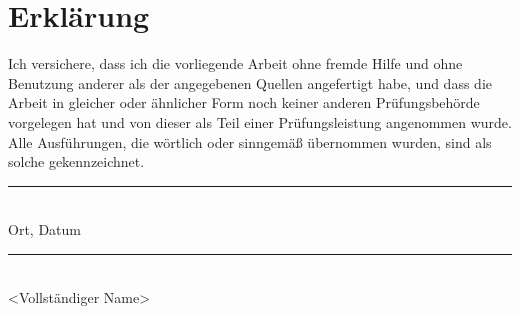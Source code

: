 \chapter*{Erklärung}
\thispagestyle{empty}

\noindent
Ich versichere, dass ich die vorliegende Arbeit ohne fremde Hilfe und ohne Benutzung anderer als der angegebenen Quellen angefertigt habe, und dass die Arbeit in gleicher oder ähnlicher Form noch keiner anderen Prüfungsbehörde vorgelegen hat und von dieser als Teil einer Prüfungsleistung angenommen wurde.
Alle Ausführungen, die wörtlich oder sinngemäß übernommen wurden, sind als solche gekennzeichnet.

\vspace{3cm}

\begin{minipage}[t]{0.45\textwidth}
    \rule{\textwidth}{0.5pt}\\
	Ort, Datum
\end{minipage}
\hfill
\begin{minipage}[t]{0.45\textwidth}
	\rule{\textwidth}{0.5pt}\\
	<Vollständiger Name>
\end{minipage}
